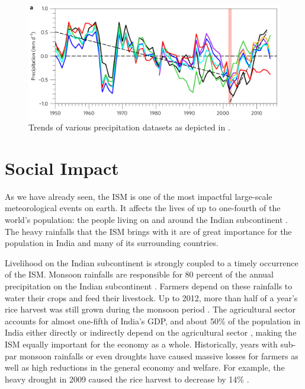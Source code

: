\begin{figure}[h]
  \centering
  \includegraphics[width=0.7\linewidth]{./99_appendix/img/precipitation_trend}
  \caption{Trends of various precipitation datasets as depicted in \citet{Jin.2017}.}
  \label{fig:precipitation_trend}
\end{figure}


\section{Social Impact}
\label{st:ism_impact}
As we have already seen, the ISM is one of the most impactful large-scale meteorological events on earth. It affects the lives of up to one-fourth of the world's population: the people living on and around the Indian subcontinent \citep{Stolbova.2015}. The heavy rainfalls that the ISM brings with it are of great importance for the population in India and many of its surrounding countries.

Livelihood on the Indian subcontinent is strongly coupled to a timely occurrence of the ISM. Monsoon rainfalls are responsible for 80 percent of the annual precipitation on the Indian subcontinent \citep{Jin.2017}. Farmers depend on these rainfalls to water their crops and feed their livestock. Up to 2012, more than half of a year's rice harvest was still grown during the monsoon period \citep{Auffhammer.2012}. The agricultural sector accounts for almost one-fifth of India's GDP, and about 50\% of the population in India either directly or indirectly depend on the agricultural sector \citep{CentralIntelligenceAgency.05.01.2018}, making the ISM equally important for the economy as a whole. Historically, years with sub-par monsoon rainfalls or even droughts have caused massive losses for farmers as well as high reductions in the general economy and welfare. For example, the heavy drought in 2009 caused the rice harvest to decrease by 14\% \citep{Auffhammer.2012}.

